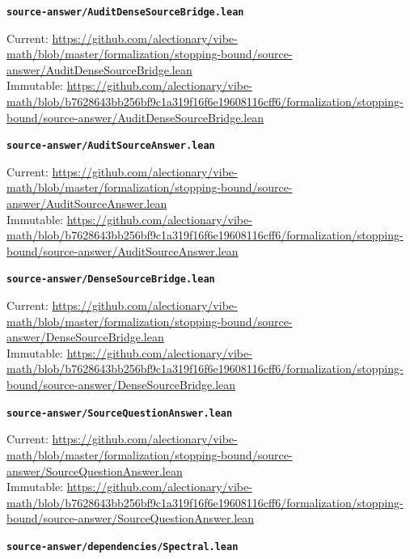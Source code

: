 \smallskip
\medskip
\par\noindent\textbf{\texttt{source-answer/AuditDenseSourceBridge.lean}}\par\nopagebreak
{\footnotesize\noindent Current: \url{https://github.com/alectionary/vibe-math/blob/master/formalization/stopping-bound/source-answer/AuditDenseSourceBridge.lean}\\
Immutable: \url{https://github.com/alectionary/vibe-math/blob/b7628643bb256bf9c1a319f16f6e19608116cff6/formalization/stopping-bound/source-answer/AuditDenseSourceBridge.lean}\par}
\smallskip
\medskip
\par\noindent\textbf{\texttt{source-answer/AuditSourceAnswer.lean}}\par\nopagebreak
{\footnotesize\noindent Current: \url{https://github.com/alectionary/vibe-math/blob/master/formalization/stopping-bound/source-answer/AuditSourceAnswer.lean}\\
Immutable: \url{https://github.com/alectionary/vibe-math/blob/b7628643bb256bf9c1a319f16f6e19608116cff6/formalization/stopping-bound/source-answer/AuditSourceAnswer.lean}\par}
\smallskip
\medskip
\par\noindent\textbf{\texttt{source-answer/DenseSourceBridge.lean}}\par\nopagebreak
{\footnotesize\noindent Current: \url{https://github.com/alectionary/vibe-math/blob/master/formalization/stopping-bound/source-answer/DenseSourceBridge.lean}\\
Immutable: \url{https://github.com/alectionary/vibe-math/blob/b7628643bb256bf9c1a319f16f6e19608116cff6/formalization/stopping-bound/source-answer/DenseSourceBridge.lean}\par}
\smallskip
\medskip
\par\noindent\textbf{\texttt{source-answer/SourceQuestionAnswer.lean}}\par\nopagebreak
{\footnotesize\noindent Current: \url{https://github.com/alectionary/vibe-math/blob/master/formalization/stopping-bound/source-answer/SourceQuestionAnswer.lean}\\
Immutable: \url{https://github.com/alectionary/vibe-math/blob/b7628643bb256bf9c1a319f16f6e19608116cff6/formalization/stopping-bound/source-answer/SourceQuestionAnswer.lean}\par}
\smallskip
\medskip
\par\noindent\textbf{\texttt{source-answer/dependencies/Spectral.lean}}\par\nopagebreak
